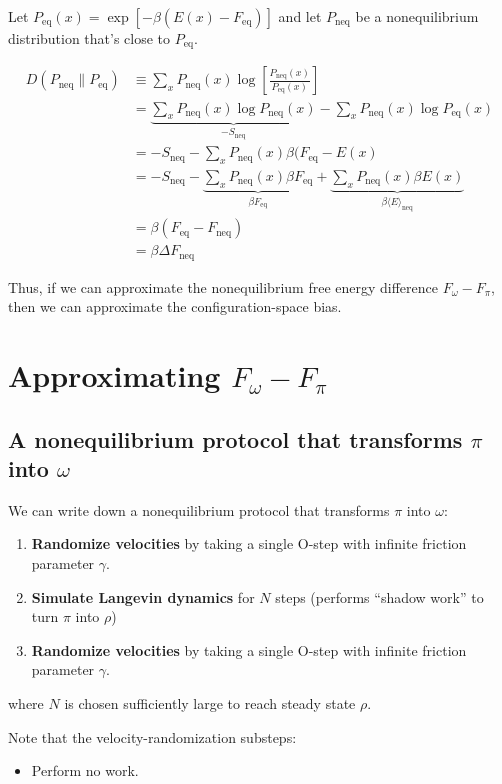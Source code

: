 \documentclass[11pt]{article}
\newcommand{\feq}{F_\text{eq}}
\newcommand{\fneq}{F_\text{neq}}
\newcommand{\pneq}{P_\text{neq}}
\newcommand{\peq}{P_\text{eq}}
\newcommand{\sneq}{S_\text{neq}}
\begin{document}
Let $\peq(x) = \exp [-\beta (E (x) - \feq)]$ and let $\pneq$ be a nonequilibrium distribution that's close to $\peq$.

\begin{align}
D( \pneq \| \peq) &\equiv \sum_x \pneq(x) \log \left[\frac{\pneq(x)}{\peq (x)} \right]\\
&=\underbrace{ \sum_x \pneq(x) \log \pneq(x) }_{- \sneq } - \sum_x \pneq(x) \log \peq (x)\\
&= - \sneq - \sum_x \pneq(x) \beta (\feq - E(x)\\
&= - \sneq - \underbrace{\sum_x \pneq(x) \beta \feq}_{\beta \feq} + \underbrace{\sum_x \pneq(x) \beta E(x)}_{\beta \langle E \rangle_\text{neq}}\\
&= \beta (\feq - \fneq)\\
&= \beta \Delta \fneq
\end{align}

Thus, if we can approximate the nonequilibrium free energy difference $F_\omega - F_\pi$, then we can approximate the configuration-space bias.


\section{Approximating $F_\omega - F_\pi$}
\subsection{A nonequilibrium protocol that transforms $\pi$ into $\omega$}
We can write down a nonequilibrium protocol that transforms $\pi$ into $\omega$:
\begin{enumerate}
\item \textbf{Randomize velocities} by taking a single O-step with infinite friction parameter $\gamma$.
\item \textbf{Simulate Langevin dynamics} for $N$ steps (performs ``shadow work'' to turn $\pi$ into $\rho$)
\item \textbf{Randomize velocities} by taking a single O-step with infinite friction parameter $\gamma$.
\end{enumerate}
where $N$ is chosen sufficiently large to reach steady state $\rho$.

Note that the velocity-randomization substeps:
\begin{itemize}
\item Perform no work.
\end{itemize}
\end{document}
